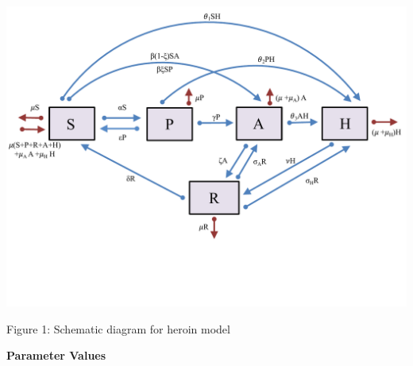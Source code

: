 \documentclass[12pt]{article}
\begin{document}
\includegraphics[scale=0.6]{heroin_schematic.pdf}
\vspace{-3cm}
\begin{center}
Figure 1: Schematic diagram for heroin model
\end{center}

 \textbf{Parameter Values} \\
\end{document}
